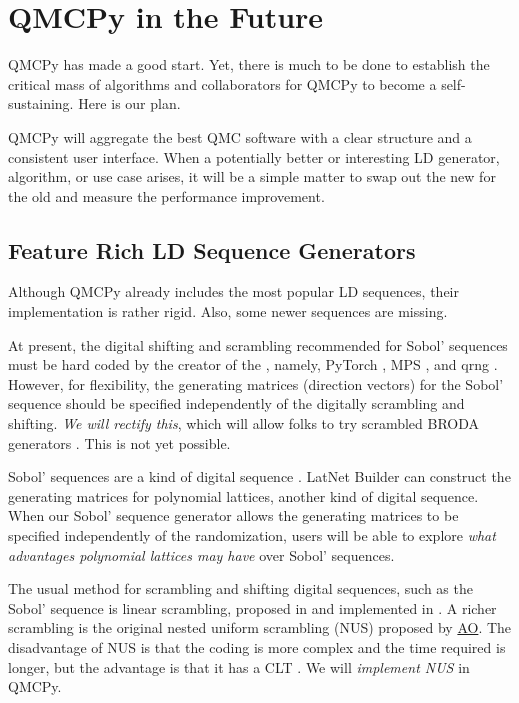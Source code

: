 \documentclass[11pt]{NSFamsart}
\newcommand{\AO}{\hyperlink{AOlink}{AO}\xspace}
\begin{document}
\section{QMCPy in the Future}
QMCPy has made a good start.  Yet, there is much to be done to establish the critical mass of algorithms and collaborators for QMCPy to become a self-sustaining.  Here is our plan.

QMCPy will aggregate the best QMC software with a clear structure and a consistent user interface.  When a potentially better or interesting LD generator, algorithm, or use case arises, it will be a simple matter to swap out the new for the old and measure the performance improvement.

\subsection{Feature Rich LD Sequence Generators} \label{sec:richLD}
Although QMCPy already includes the most popular LD sequences, their implementation is rather rigid.  Also, some newer sequences are missing.

At present, the digital shifting and scrambling recommended for Sobol' sequences must be hard coded by the creator of the , namely, PyTorch \cite{PyTorch}, MPS \cite{Nuy17a}, and qrng \cite{QRNG2020}.  However, for flexibility, the generating matrices (direction vectors) for the Sobol' sequence should be specified independently of the digitally scrambling and shifting.  \emph{We will rectify this}, which will allow folks to try scrambled BRODA generators \cite{BRODA20a}.  This is not yet possible.

Sobol' sequences are a kind of digital sequence \cite{DicPil10a}.  LatNet Builder \cite{LatNet} can construct the generating matrices for polynomial lattices,  another kind of digital sequence.  When our Sobol' sequence generator allows the  generating matrices to be specified independently of the randomization, users will be able to explore  \emph{what advantages polynomial lattices may have} over Sobol' sequences.

The usual method for scrambling and shifting digital sequences, such as the Sobol' sequence is linear scrambling, proposed in \cite{Mat98} and implemented in \cite{HonHic00a}.  A richer scrambling is the original nested uniform scrambling (NUS) proposed by \AO \cite{Owe95}.  The disadvantage of NUS is that the coding is more complex and the time required is longer, but the advantage is that it has a CLT  \cite{Loh01}.  We will \emph{implement NUS} in QMCPy.
\end{document}
